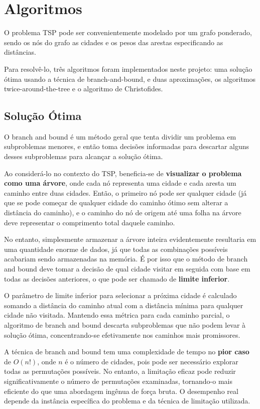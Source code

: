 \section{Algoritmos} \label{sec:algoritmos}

O problema TSP pode ser convenientemente modelado por um grafo ponderado, sendo os nós do grafo 
as cidades e os pesos das arestas especificando as distâncias.

Para resolvê-lo, três algoritmos foram implementados neste projeto: uma solução ótima usando 
a técnica de branch-and-bound, e duas aproximações, os algoritmos twice-around-the-tree e o 
algoritmo de Christofides.

\subsection{Solução Ótima} \label{sec:optimal_explanation}

O branch and bound é um método geral que tenta dividir um problema em subproblemas menores,
e então toma decisões informadas para descartar alguns desses subproblemas para alcançar a solução ótima.

Ao considerá-lo no contexto do TSP, beneficia-se de \textbf{visualizar o problema como uma árvore}, onde cada nó 
representa uma cidade e cada aresta um caminho entre duas cidades. Então, o primeiro nó pode ser qualquer cidade 
(já que se pode começar de qualquer cidade do caminho ótimo sem alterar a distância do caminho), e 
o caminho do nó de origem até uma folha na árvore deve representar o comprimento total 
daquele caminho.

No entanto, simplesmente armazenar a árvore inteira evidentemente resultaria em uma quantidade enorme 
de dados, já que todas as combinações possíveis acabariam sendo armazenadas na memória. É por isso que o 
método de branch and bound deve tomar a decisão de qual cidade visitar em seguida com base em todas as decisões 
anteriores, o que pode ser chamado de \textbf{limite inferior}.

O parâmetro de limite inferior para selecionar a próxima cidade é calculado somando a 
distância do caminho atual com a distância mínima para qualquer cidade não visitada. Mantendo essa métrica 
para cada caminho parcial, o algoritmo de branch and bound descarta subproblemas que não podem 
levar à solução ótima, concentrando-se efetivamente nos caminhos mais promissores.

A técnica de branch and bound tem uma complexidade de tempo no \textbf{pior caso} de $O(n!)$, 
onde $n$ é o número de cidades, pois pode ser necessário explorar todas as permutações possíveis. 
No entanto, a limitação eficaz pode reduzir significativamente o número de permutações examinadas, 
tornando-o mais eficiente do que uma abordagem ingênua de força bruta. O desempenho real depende da 
instância específica do problema e da técnica de limitação utilizada.

